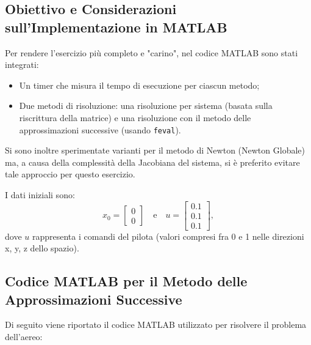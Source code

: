\documentclass[11pt]{article}
\begin{document}
\vspace{1em}
\subsection*{Obiettivo e Considerazioni sull'Implementazione in MATLAB}
Per rendere l'esercizio più completo e "carino", nel codice MATLAB sono stati integrati:

\begin{itemize}
  \item Un timer che misura il tempo di esecuzione per ciascun metodo;
  \item Due metodi di risoluzione: una risoluzione per sistema (basata sulla riscrittura della matrice) e una risoluzione con il metodo delle approssimazioni successive (usando \texttt{feval}).
\end{itemize}

Si sono inoltre sperimentate varianti per il metodo di Newton (Newton Globale) ma, a causa della complessità della Jacobiana del sistema, si è preferito evitare tale approccio per questo esercizio.

\vspace{1em}
I dati iniziali sono:
\[
x_0=\begin{bmatrix}0\\0\end{bmatrix}
\quad \text{e} \quad
u = \begin{bmatrix}0.1\\0.1\\0.1\end{bmatrix},
\]
dove \(u\) rappresenta i comandi del pilota (valori compresi fra 0 e 1 nelle direzioni x, y, z dello spazio).

\subsection*{Codice MATLAB per il Metodo delle Approssimazioni Successive}

Di seguito viene riportato il codice MATLAB utilizzato per risolvere il problema dell'aereo:
\end{document}
